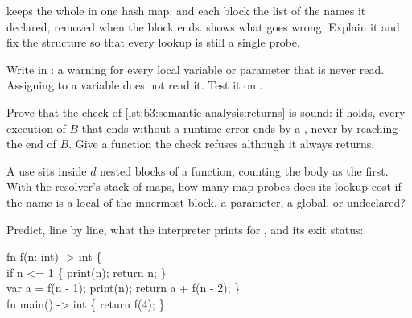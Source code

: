 \begin{exercise}[$\star\star$]\label{exo:b3:semantic-analysis:5}
 keeps the whole  in one hash map, and each block the list of the names it declared, removed when the block ends.  shows what goes wrong. Explain it and fix the structure so that every lookup is still a single probe.
\label{lst:b3:semantic-analysis:flat}
\label{out:b3:semantic-analysis:flat}
\end{exercise}

\begin{exercise}[$\star\star$]\label{exo:b3:semantic-analysis:6}
Write  in : a warning for every local variable or parameter that is never read. Assigning to a variable does not read it. Test it on .
\end{exercise}

\begin{exercise}[$\star\star$]\label{exo:b3:semantic-analysis:7}
Prove that the check of \cref{lst:b3:semantic-analysis:returns} is sound: if  holds, every execution of $B$ that ends without a runtime error ends by a , never by reaching the end of $B$. Give a function the check refuses although it always returns.
\end{exercise}

\begin{exercise}[$\star\star$]\label{exo:b3:semantic-analysis:8}
A use sits inside $d$ nested blocks of a function, counting the body as the first. With the resolver's stack of maps, how many map probes does its lookup cost if the name is a local of the innermost block, a parameter, a global, or undeclared?
\end{exercise}

\begin{exercise}[$\star\star$]\label{exo:b3:semantic-analysis:9}
Predict, line by line, what the interpreter prints for , and its exit status:
\begin{center}\small\ttfamily\frenchspacing fn f(n: int) -> int \{\\ if n <= 1 \{ print(n); return n; \}\\ var a = f(n - 1); print(n); return a + f(n - 2); \}\\ fn main() -> int \{ return f(4); \}\end{center}
\end{exercise}

